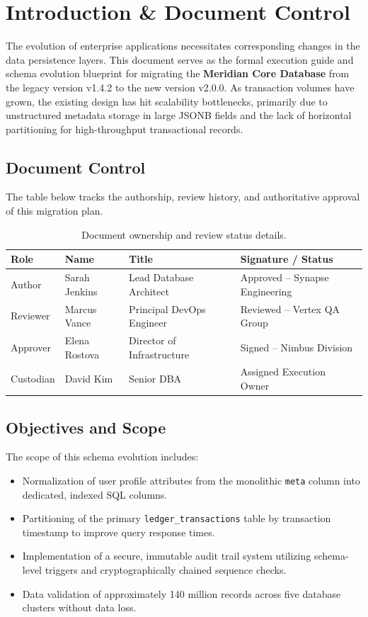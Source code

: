 \section{Introduction \& Document Control}

The evolution of enterprise applications necessitates corresponding changes in the data persistence layers. This document serves as the formal execution guide and schema evolution blueprint for migrating the \textbf{Meridian Core Database} from the legacy version v1.4.2 to the new version v2.0.0. As transaction volumes have grown, the existing design has hit scalability bottlenecks, primarily due to unstructured metadata storage in large JSONB fields and the lack of horizontal partitioning for high-throughput transactional records.

\subsection{Document Control}
The table below tracks the authorship, review history, and authoritative approval of this migration plan.

\begin{table}[h]
\small
\centering
\begin{tabularx}{\textwidth}{L{2.5cm} L{3.5cm} L{3.5cm} Y}
\toprule
\textbf{Role} & \textbf{Name} & \textbf{Title} & \textbf{Signature / Status} \\
\midrule
Author & Sarah Jenkins & Lead Database Architect & Approved -- Synapse Engineering \\
Reviewer & Marcus Vance & Principal DevOps Engineer & Reviewed -- Vertex QA Group \\
Approver & Elena Rostova & Director of Infrastructure & Signed -- Nimbus Division \\
Custodian & David Kim & Senior DBA & Assigned Execution Owner \\
\bottomrule
\end{tabularx}
\caption{Document ownership and review status details.}
\label{tab:doc_control}
\end{table}

\subsection{Objectives and Scope}
The scope of this schema evolution includes:
\begin{itemize}
    \item Normalization of user profile attributes from the monolithic \texttt{meta} column into dedicated, indexed SQL columns.
    \item Partitioning of the primary \texttt{ledger\_transactions} table by transaction timestamp to improve query response times.
    \item Implementation of a secure, immutable audit trail system utilizing schema-level triggers and cryptographically chained sequence checks.
    \item Data validation of approximately 140 million records across five database clusters without data loss.
\end{itemize}


